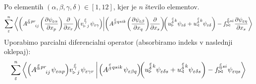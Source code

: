Po elementih $(\alpha, \beta, \gamma, \delta) \in [1,12]$, kjer je $n$ število elementov.
\begin{equation}
   \sum^n_{\varepsilon}
   \braket{
      \qty(A^{\substack{\mkern2mu \varepsilon \\[-0.65mm] \alpha} \mkern2mu p r}_{\mkern29mu i j} \mkern2mu
      \qty( \pdv{\psi_{ \varepsilon \alpha}}{x_p} ) \frac{\partial}{\partial x_r} ) \mkern-4mu
      \qty(v^{\mkern 2mu \substack{\varepsilon \\[-0.65mm] \gamma \\[-0.2mm]}}_{\triangleright \mkern5mu j} \mkern2mu
         \psi_{\varepsilon \gamma} )}
   {
      \qty(A^{\substack{\mkern2mu \varepsilon \\[-0.05mm] \beta} \mkern2mu q s i k} \mkern2mu
      \qty( \pdv{\psi_{\varepsilon \beta}}{x_q} ) \frac{\partial}{\partial x_s} ) \mkern-4mu
      \qty(u^{\substack{\mkern2mu \varepsilon \\[0.10mm] \delta} \mkern2mu k}_\triangleright
      \psi_{\varepsilon \delta}
      +
      u^{\substack{\mkern2mu \varepsilon \\[0.10mm] \delta} \mkern2mu k}_\triangleleft
      \psi_{\varepsilon \delta} )
      -
      f^{\substack{\mkern2mu \varepsilon \\[-0.59mm] \eta} \mkern1mu s i}_{\bowtie} \mkern1mu
      \pdv{\psi_{\varepsilon \eta}}{x_s}}
\end{equation}
Uporabimo parcialni diferencialni operator (absorbiramo indeks v naslednji oklepaj):
\begin{equation*}
   \sum^n_\varepsilon
   \braket{
      \qty( A^{\substack{\mkern2mu \varepsilon \\[-0.65mm] \alpha} \mkern2mu p r}_{\mkern29mu i j} \mkern2mu
      \psi_{ \varepsilon \alpha p} )
      v^{\mkern 2mu \substack{\varepsilon \\[-0.65mm] \gamma \\[-0.2mm]}}_{\triangleright \mkern5mu j} \mkern2mu
      \psi_{\varepsilon \gamma r} \mkern4mu}
   {
      \mkern2mu \qty( A^{\substack{\mkern2mu \varepsilon \\[0.05mm] \beta} \mkern2mu q s i k} \mkern2mu
      \psi_{\varepsilon \beta q} ) \mkern-4mu 
      \qty( u^{\substack{\mkern2mu \varepsilon \\[0.10mm] \delta} \mkern2mu k}_\triangleright
      \psi_{\varepsilon \delta s}
      +
      u^{\substack{\mkern2mu \varepsilon \\[0.10mm] \delta} \mkern2mu k}_\triangleleft
      \psi_{\varepsilon \delta s} )
      -
      f^{\substack{\mkern2mu \varepsilon \\[-0.59mm] \eta} \mkern1mu s i}_{\bowtie} \mkern1mu
      \psi_{\varepsilon \eta s} }
\end{equation*}
